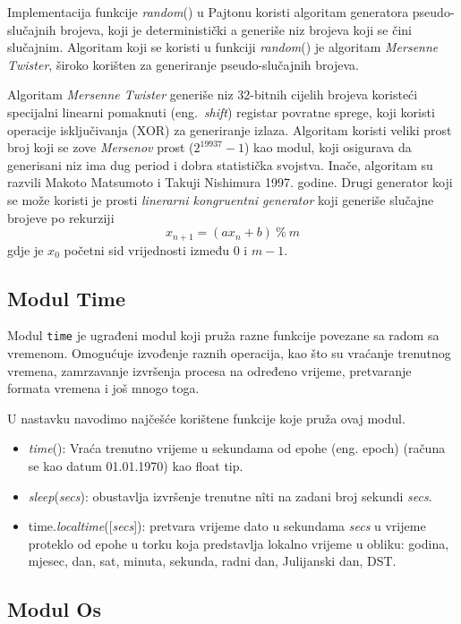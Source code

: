 Implementacija funkcije \textit{random}() u Pajtonu koristi algoritam gene\-ratora pseudo-slučajnih brojeva, koji je deterministički a generiše niz brojeva koji se čini slučajnim. Algoritam koji se koristi u funkciji \textit{random}() je algoritam \textit{Mersenne Twister},  široko korišten   za generiranje pseudo-slučajnih brojeva.

Algoritam \textit{Mersenne Twister} generiše niz 32-bitnih cijelih brojeva koriste\-ći specijalni linearni pomaknuti (eng.\ \textit{shift})  registar povratne sprege,  koji koristi operacije isključivanja (XOR) za generiranje izlaza. Algoritam koristi veliki prost broj koji se zove \textit{Mersenov} prost ($2^{19937}-1$) kao modul, koji osigurava da generisani niz ima dug period   i dobra statistička svojstva. Inače, algoritam su razvili Makoto Matsumoto i Takuji Nishimura 1997. godine. Drugi generator  koji se može koristi je prosti \textit{linerarni kongruentni generator} 
koji generiše  slučajne brojeve po rekurziji
$$ x_{n+1} = (a x_n + b)\ \%\ m $$
gdje je $x_0$ početni sid vrijednosti između 0 i $m-1$. 

\subsection{Modul Time}

Modul  \texttt{time} je ugrađeni modul koji pruža razne funkcije povezane sa radom sa vremenom. Omogućuje   izvođenje raznih operacija, kao što su vraćanje trenutnog vremena, zamrzavanje izvršenja procesa na određeno vrijeme,  pre\-tvaranje formata vremena i još mnogo toga.

U nastavku navodimo najčešće korištene funkcije koje pruža ovaj modul. 
\begin{itemize}
	\item  \textit{time}(): Vraća trenutno vrijeme u sekundama od epohe (eng. epoch) (računa se kao datum 01.01.1970) kao float tip. 
	\item \textit{sleep}(\textit{secs}): obustavlja izvršenje trenutne n\^iti na zadani broj sekundi \textit{secs}. 
	\item time.\textit{localtime}([\textit{secs}]): pretvara vrijeme dato u sekundama  \textit{secs} u vrijeme proteklo od epohe u torku koja predstavlja lokalno vrijeme u obliku:  godina, mjesec, dan, sat, minuta, sekunda, radni dan, Julijanski dan, DST.
\end{itemize}


\subsection{Modul Os}

